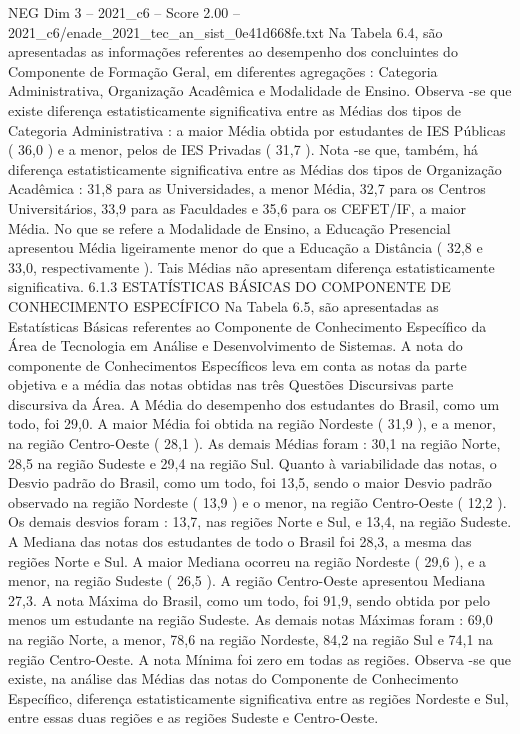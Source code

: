 \begin{textsample}{NEG Dim 3 – 2021\_c6 – Score 2.00 – 2021\_c6/enade\_2021\_tec\_an\_sist\_0e41d668fe.txt}
Na Tabela 6.4, são apresentadas as informações referentes ao desempenho dos concluintes do Componente de Formação Geral, em diferentes agregações : Categoria Administrativa, Organização Acadêmica e Modalidade de Ensino.
Observa -se que existe diferença estatisticamente significativa entre as Médias dos tipos de Categoria Administrativa : a maior Média obtida por estudantes de IES Públicas ( 36,0 ) e a menor, pelos de IES Privadas ( 31,7 ).
Nota -se que, também, há diferença estatisticamente significativa entre as Médias dos tipos de Organização Acadêmica : 31,8 para as Universidades, a menor Média, 32,7 para os Centros Universitários, 33,9 para as Faculdades e 35,6 para os CEFET/IF, a maior Média.
No que se refere a Modalidade de Ensino, a Educação Presencial apresentou Média ligeiramente menor do que a Educação a Distância ( 32,8 e 33,0, respectivamente ).
Tais Médias não apresentam diferença estatisticamente significativa. 6.1.3 ESTATÍSTICAS BÁSICAS DO COMPONENTE DE CONHECIMENTO ESPECÍFICO Na Tabela 6.5, são apresentadas as Estatísticas Básicas referentes ao Componente de Conhecimento Específico da Área de Tecnologia em Análise e Desenvolvimento de Sistemas.
A nota do componente de Conhecimentos Específicos leva em conta as notas da parte objetiva e a média das notas obtidas nas três Questões Discursivas parte discursiva da Área.
A Média do desempenho dos estudantes do Brasil, como um todo, foi 29,0.
A maior Média foi obtida na região Nordeste ( 31,9 ), e a menor, na região Centro-Oeste ( 28,1 ).
As demais Médias foram : 30,1 na região Norte, 28,5 na região Sudeste e 29,4 na região Sul.
Quanto à variabilidade das notas, o Desvio padrão do Brasil, como um todo, foi 13,5, sendo o maior Desvio padrão observado na região Nordeste ( 13,9 ) e o menor, na região Centro-Oeste ( 12,2 ).
Os demais desvios foram : 13,7, nas regiões Norte e Sul, e 13,4, na região Sudeste.
A Mediana das notas dos estudantes de todo o Brasil foi 28,3, a mesma das regiões Norte e Sul.
A maior Mediana ocorreu na região Nordeste ( 29,6 ), e a menor, na região Sudeste ( 26,5 ).
A região Centro-Oeste apresentou Mediana 27,3.
A nota Máxima do Brasil, como um todo, foi 91,9, sendo obtida por pelo menos um estudante na região Sudeste.
As demais notas Máximas foram : 69,0 na região Norte, a menor, 78,6 na região Nordeste, 84,2 na região Sul e 74,1 na região Centro-Oeste.
A nota Mínima foi zero em todas as regiões.
Observa -se que existe, na análise das Médias das notas do Componente de Conhecimento Específico, diferença estatisticamente significativa entre as regiões Nordeste e Sul, entre essas duas regiões e as regiões Sudeste e Centro-Oeste.

\end{textsample}

